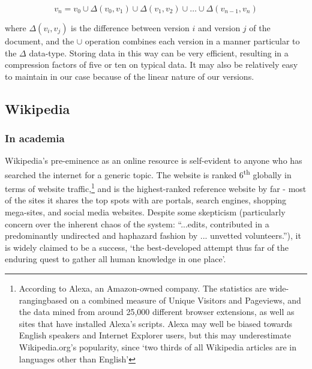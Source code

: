 \documentclass[a4paper,11pt,twoside,notitlepage]{article}
\newcommand{\super}[1]{\textsuperscript{#1}}
\begin{document}
        $$v_n = v_0 \cup {\Delta}(v_0,v_1) \cup {\Delta}(v_1,v_2)
        \cup \dots \cup {\Delta}(v_{n-1},v_n) $$

        where ${\Delta}(v_i,v_j)$ is the difference between version
        $i$ and version $j$ of the document, and the $\cup$ operation
        combines each version in a manner particular to the $\Delta$
        data-type. Storing data in this way can be very efficient,
        resulting in a compression factors of five or ten on typical
        data.\cite{Macdonald2000} It may also be relatively easy to
        maintain in our case because of the linear nature of our
        versions.  

 
        \subsection{Wikipedia}
        \subsubsection*{In academia}
        Wikipedia's pre-eminence as an online resource is self-evident
        to anyone who has searched the internet for a generic
        topic. The website is ranked 6\super{th} globally in terms of
        website traffic,\footnote{According to Alexa, an Amazon-owned
          company. The statistics are wide-rangingbased on a combined
          measure of Unique Visitors and Pageviews, and the data mined
          from around 25,000 different browser extensions, as well as
          sites that have installed Alexa's
          scripts.\cite{Alexa-about2014} Alexa may well be biased
          towards English speakers and Internet Explorer users, but
          this may underestimate Wikipedia.org's popularity, since
          `two thirds of all Wikipedia articles are in languages other
          than English'\cite{wikimedia-noteonalexa}} and is the
        highest-ranked reference website by far - most of the sites it
        shares the top spots with are portals, search engines,
        shopping mega-sites, and social media
        websites.\cite{Alexa-topsites2014} Despite some skepticism
        (particularly concern over the inherent chaos of the system:
        ``...edits, contributed in a predominantly undirected and
        haphazard fashion by ... unvetted
        volunteers.''\cite{Wilkinson2007}), it is widely
        claimed to be a success, `the best-developed attempt thus
        far of the enduring quest to gather all human knowledge in one
        place'\cite{Mesgari2014}.
\end{document}

